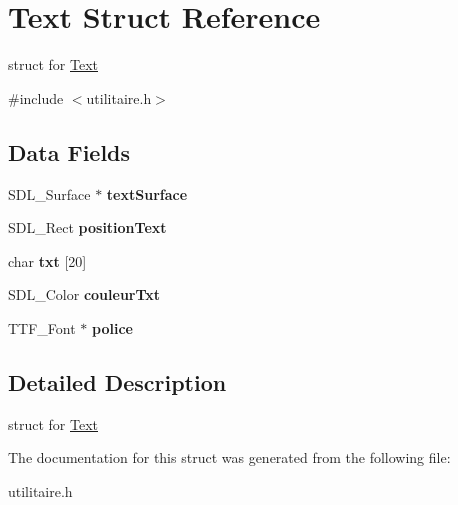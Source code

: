 \hypertarget{structText}{}\section{Text Struct Reference}
\label{structText}


struct for \hyperlink{structText}{Text}  




{\ttfamily \#include $<$utilitaire.\+h$>$}

\subsection*{Data Fields}
\begin{DoxyCompactItemize}
\item 
S\+D\+L\+\_\+\+Surface $\ast$ {\bfseries text\+Surface}\hypertarget{structText_aa62d89be189c1522d97c221b3c1fea81}{}\label{structText_aa62d89be189c1522d97c221b3c1fea81}

\item 
S\+D\+L\+\_\+\+Rect {\bfseries position\+Text}\hypertarget{structText_ad9efd8ca20e485d7c15790e748429345}{}\label{structText_ad9efd8ca20e485d7c15790e748429345}

\item 
char {\bfseries txt} \mbox{[}20\mbox{]}\hypertarget{structText_ae4c1e2eef4f3f19d5be9793e6e2df17b}{}\label{structText_ae4c1e2eef4f3f19d5be9793e6e2df17b}

\item 
S\+D\+L\+\_\+\+Color {\bfseries couleur\+Txt}\hypertarget{structText_a2b4f89e854de412a5d2e21ad5a827aa3}{}\label{structText_a2b4f89e854de412a5d2e21ad5a827aa3}

\item 
T\+T\+F\+\_\+\+Font $\ast$ {\bfseries police}\hypertarget{structText_a68484d7ee9aa7d5b600aa58245f143a5}{}\label{structText_a68484d7ee9aa7d5b600aa58245f143a5}

\end{DoxyCompactItemize}


\subsection{Detailed Description}
struct for \hyperlink{structText}{Text} 

The documentation for this struct was generated from the following file\+:\begin{DoxyCompactItemize}
\item 
utilitaire.\+h\end{DoxyCompactItemize}
